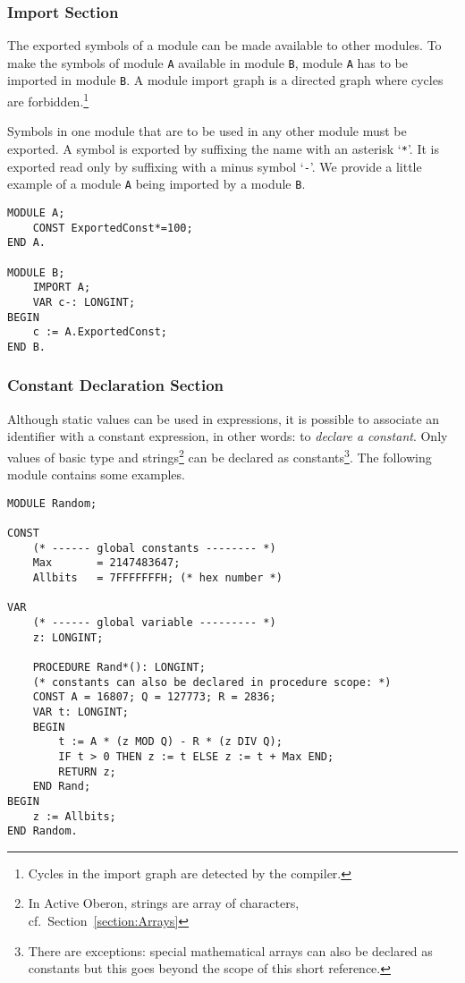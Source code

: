 \documentclass[a4paper,11pt]{article}
\begin{document}
\subsubsection{Import Section} \label{section:ImportList}
The exported symbols of a module can be made available to other modules. To make the symbols of module \verb+A+ available in module \verb+B+, module \verb+A+ has to be imported in module \verb+B+. A module import graph is a directed graph where cycles are forbidden.\footnote{Cycles in the import graph are detected by the compiler.}

Symbols in one module that are to be used in any other module must be exported. A symbol is exported by suffixing the name with an asterisk `\verb+*+'. It is exported read only by suffixing with a minus symbol `\verb+-+'. We provide a little example of a module \verb+A+ being imported by a module \verb+B+.

\begin{lstlisting}[language=Oberon,frame=none,caption={B imports A}]
MODULE A;
    CONST ExportedConst*=100;
END A.

MODULE B;
    IMPORT A;
    VAR c-: LONGINT;
BEGIN
    c := A.ExportedConst;
END B.
\end{lstlisting}

\subsubsection{Constant Declaration Section}\label{section:ConstantDeclarationSection}
Although static values can be used in expressions, it is possible to associate an identifier with a constant expression, in other words: to {\em declare a constant}. Only values of basic type and strings\footnote{In Active Oberon, strings are array of characters, cf.~Section~\ref{section:Arrays}} can be declared as constants\footnote{There are exceptions: special mathematical arrays can also be declared as constants but this goes beyond the scope of this short reference.}. The following module contains some examples.

\begin{lstlisting}[language=Oberon,frame=none,caption={Declaration and Usage of Constants}]
MODULE Random;

CONST
    (* ------ global constants -------- *)
    Max       = 2147483647;
    Allbits   = 7FFFFFFFH; (* hex number *)

VAR
    (* ------ global variable --------- *)
    z: LONGINT;

    PROCEDURE Rand*(): LONGINT;
    (* constants can also be declared in procedure scope: *)
    CONST A = 16807; Q = 127773; R = 2836;
    VAR t: LONGINT;
    BEGIN
        t := A * (z MOD Q) - R * (z DIV Q);
        IF t > 0 THEN z := t ELSE z := t + Max END;
        RETURN z;
    END Rand;
BEGIN
    z := Allbits;
END Random.
\end{lstlisting}
\end{document}

